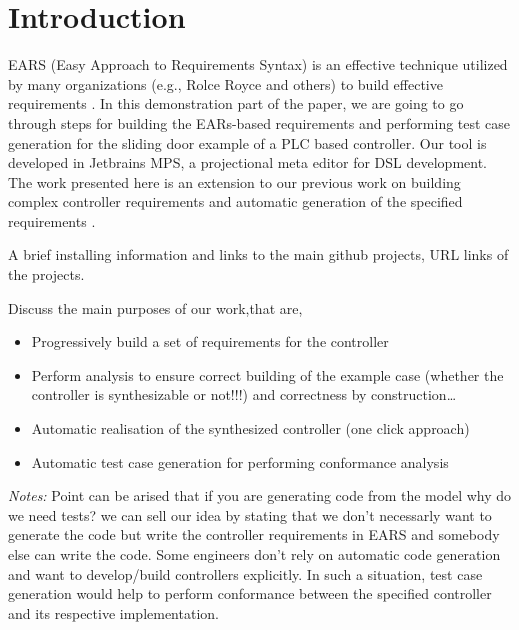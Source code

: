 \section{Introduction}
\label{sec:intro}
EARS (Easy Approach to Requirements Syntax) is an effective technique utilized
by many organizations (e.g., Rolce Royce and others) to build effective
requirements \cite{EARS}. In this demonstration part of the paper, we are going
to go through steps for building the EARs-based requirements and performing test case generation for the
sliding door example of a PLC based controller. Our tool is developed in
Jetbrains MPS, a projectional meta editor for DSL
development\cite{DBLP:conf/pppj/PechSV13}. The work presented here is an
extension to our previous work on building complex controller requirements and
automatic generation of the specified requirements
\cite{LucioRCA16}.

A brief installing information and links to the main github projects, URL links
of the projects.

Discuss the main purposes of our work,that are,
\begin{itemize}
  \item Progressively build a set of requirements for the controller
  \item Perform analysis to ensure correct building of the example case
  (whether the controller is synthesizable or not!!!) and correctness by
  construction\ldots
  \item Automatic realisation of the synthesized controller (one click approach)
  \item Automatic test case generation for performing conformance analysis
\end{itemize}
\emph{Notes:}
Point can be arised that if you are generating code from the model why do we need tests? we can sell our
idea by stating that we don't necessarly want to generate the code but write the
controller requirements in EARS and somebody else can write the code. Some
engineers don't rely on automatic code generation and want to develop/build
controllers explicitly. In such a situation, test case generation would help to
perform conformance between the specified controller and its respective
implementation. 
